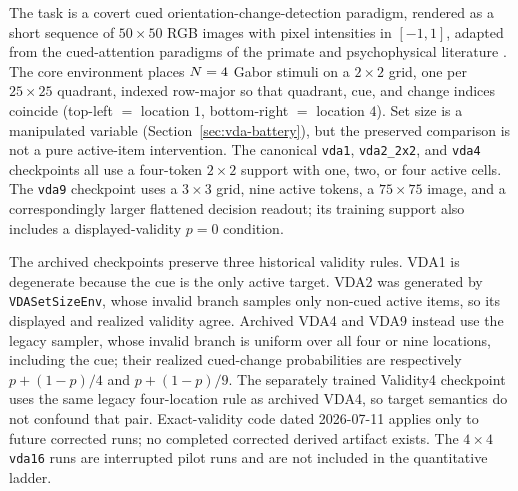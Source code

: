 The task is a covert cued orientation-change-detection paradigm, rendered
as a short sequence of $50 \times 50$ RGB images with pixel intensities in
$[-1, 1]$, adapted from the cued-attention paradigms of the primate and
psychophysical literature \cite{posner1980_orienting, MullerFindlay1987,
carrasco2011_visual_attention_25y}. The core environment places
$N = 4$ Gabor stimuli on a $2\times2$ grid, one per $25\times25$
quadrant, indexed row-major so that quadrant, cue, and change indices
coincide (top-left $=$ location $1$, bottom-right $=$ location $4$). Set
size is a manipulated variable (Section~\ref{sec:vda-battery}), but the preserved
comparison is not a pure active-item intervention. The canonical
\texttt{vda1}, \texttt{vda2\_2x2}, and \texttt{vda4} checkpoints all use a
four-token $2\times2$ support with one, two, or four active cells. The
\texttt{vda9} checkpoint uses a $3\times3$ grid, nine active tokens, a
$75\times75$ image, and a correspondingly larger flattened decision readout; its
training support also includes a displayed-validity $p=0$ condition.

The archived checkpoints preserve three historical validity rules. VDA1 is
degenerate because the cue is the only active target. VDA2 was generated by
\texttt{VDASetSizeEnv}, whose invalid branch samples only non-cued active items, so
its displayed and realized validity agree. Archived VDA4 and VDA9 instead use the
legacy sampler, whose invalid branch is uniform over all four or nine locations,
including the cue; their realized cued-change probabilities are respectively
$p+(1-p)/4$ and $p+(1-p)/9$. The separately trained Validity4 checkpoint uses the
same legacy four-location rule as archived VDA4, so target semantics do not confound
that pair. Exact-validity code dated 2026-07-11 applies only to future corrected runs;
no completed corrected derived artifact exists. The
$4\times4$ \texttt{vda16} runs are interrupted pilot runs and are not included
in the quantitative ladder.

